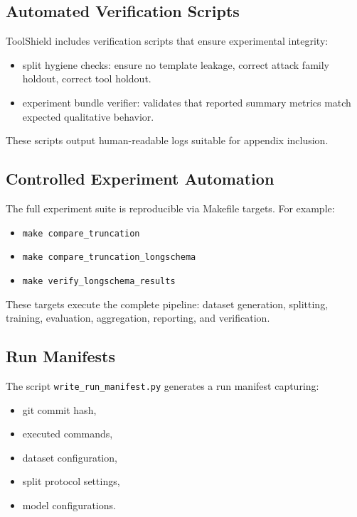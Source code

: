 \subsection{Automated Verification Scripts}

ToolShield includes verification scripts that ensure experimental integrity:

\begin{itemize}
    \item split hygiene checks: ensure no template leakage, correct attack family holdout, correct tool holdout.
    \item experiment bundle verifier: validates that reported summary metrics match expected qualitative behavior.
\end{itemize}

These scripts output human-readable logs suitable for appendix inclusion.

\subsection{Controlled Experiment Automation}

The full experiment suite is reproducible via Makefile targets. For example:

\begin{itemize}
    \item \texttt{make compare\_truncation}
    \item \texttt{make compare\_truncation\_longschema}
    \item \texttt{make verify\_longschema\_results}
\end{itemize}

These targets execute the complete pipeline: dataset generation, splitting, training, evaluation, aggregation, reporting, and verification.

\subsection{Run Manifests}

The script \texttt{write\_run\_manifest.py} generates a run manifest capturing:

\begin{itemize}
    \item git commit hash,
    \item executed commands,
    \item dataset configuration,
    \item split protocol settings,
    \item model configurations.
\end{itemize}


